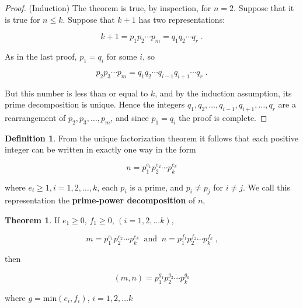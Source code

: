 \documentclass{article}
\theoremstyle{definition} %
\newtheorem{theorem}{Theorem}[section] %
\theoremstyle{definition}
\theoremstyle{definition}
\theoremstyle{definition}
\newtheorem{definition}{Definition}[section]
\begin{document}
  \begin{proof}
    (Induction) The theorem is true, by inspection, for $n = 2$. Suppose that it is true for $n \leq k$.
    Suppose that $k + 1$ has two representations:
    
    \begin{equation*}
      k + 1 = p_1p_2\cdots p_m = q_1q_2\cdots q_r\;\text{.}
    \end{equation*}
    
    As in the last proof, $p_1 = q_i$ for some $i$, so
    
    \begin{equation*}
      p_2p_3\cdots p_m = q_1q_2\cdots q_{i-1}q_{i+1}\cdots q_r\;\text{.}
    \end{equation*}
    
    But this number is less than or equal to $k$, and by the induction assumption, its prime decomposition
    is unique. Hence the integers $q_1, q_2, \dots, q_{i-1}, q_{i + 1}, \dots, q_r$ are a rearrangement of
    $p_2, p_3, \dots, p_m$, and since $p_1 = q_i$ the proof is complete.
  \end{proof}
  
  \begin{definition}
    From the unique factorization theorem it follows that each positive integer can be written in exactly
    one way in the form
    
    \begin{equation*}
      n = p_1^{e_1}p_2^{e_2}\cdots p_k^{e_k}
    \end{equation*}
    
     where $e_i \geq 1, i = 1, 2, \dots, k$, each $p_i$ is a prime, and $p_i \neq p_j$ for $i \neq j$.
     We call this representation the \textbf{prime-power decomposition} of $n$,
  \end{definition}
  
  \begin{theorem}
    If $e_1 \geq 0$, $f_1 \geq 0$, $(i = 1, 2, \dots k)$,
    
    \begin{equation*}
      m = p_1^{e_1}p_2^{e_2}\cdots p_k^{e_k} \;\;\text{and}\;\; n = p_1^{f_1}p_2^{f_2}\cdots p_k^{f_k}\;\text{,}
    \end{equation*}
    
    then
    
    \begin{equation*}
      (m, n) = p_1^{g_1}p_2^{g_2}\cdots p_k^{g_k}
    \end{equation*}
    
    where $g = \text{min}(e_i,f_i)$, $i = 1, 2, \dots k$
  \end{theorem}
  
\end{document}
